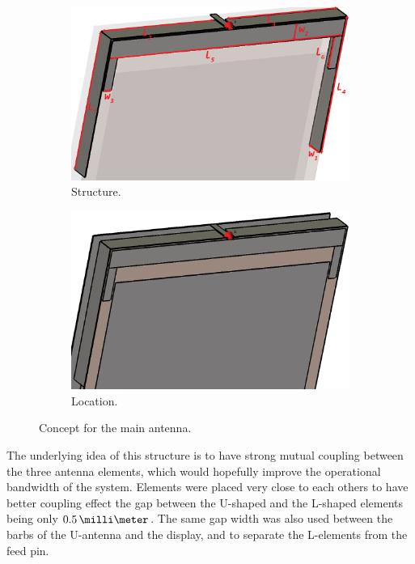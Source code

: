 \begin{figure}[H]
    \centering
    \begin{subfigure}[b]{0.49\textwidth}
        \includegraphics[width=\textwidth]{img/main_concept.eps}
        \caption{Structure.}
        \label{fig:main_concept}
    \end{subfigure}
    \begin{subfigure}[b]{0.49\textwidth}
        \includegraphics[width=\textwidth]{img/main_location.eps}
        \caption{Location.}
        \label{fig:main_location}
    \end{subfigure}
    \caption{Concept for the main antenna.}
    \label{fig:main_antenna1}
\end{figure}

The underlying idea of this structure is to have strong mutual coupling between the three antenna elements, which would hopefully improve the operational bandwidth of the system. Elements were placed very close to each others to have better coupling effect the gap between the U-shaped and the L-shaped elements being only $0.5\,\milli\meter$. The same gap width was also used between the barbs of the U-antenna and the display, and to separate the L-elements from the feed pin.


